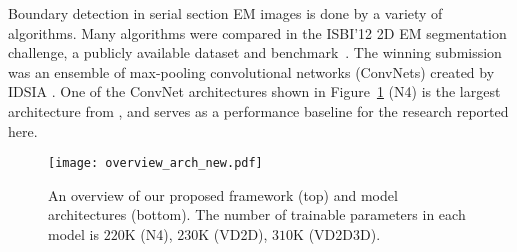 \documentclass{article} %
\begin{document}


Boundary detection in serial section EM images is done by a variety of
algorithms. Many algorithms were compared in the ISBI'12 2D EM
segmentation challenge, a publicly available dataset and benchmark~\cite{ISBI2012}.
The winning submission was an ensemble of max-pooling convolutional networks (ConvNets)
created by IDSIA \cite{Ciresan2012}. One of the
ConvNet architectures shown in Figure~\ref{overview} (N4) is the largest architecture from \cite{Ciresan2012}, and serves as a
performance baseline for the research reported here.

\begin{figure}[!b]
\begin{center}
\texttt{[image: overview\_arch\_new.pdf]}
\end{center}
\caption{An overview of our proposed framework (top) and model architectures (bottom). The number of trainable parameters in each model is $220$K (N4), $230$K (VD2D), $310$K (VD2D3D).}
\label{overview}
\end{figure}
\end{document}
